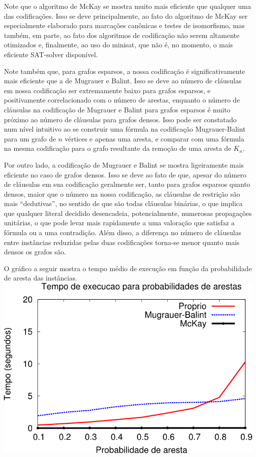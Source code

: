 \documentclass[12pt,a4paper]{article}
\begin{document}
Note que o algoritmo de McKay se mostra muito mais eficiente que qualquer uma das codificações. Isso se deve principalmente, ao 
fato do algoritmo de McKay ser especialmente elaborado para marcações canônicas e testes de isomorfismo, mas também, em parte, ao fato 
dos algoritmos de codificação não serem altamente otimizados e, finalmente, ao uso do minisat, que não é, no momento, o mais eficiente 
SAT-solver disponível.

Note também que, para grafos esparsos, a nossa codificação é significativamente mais eficiente que a de Mugrauer e Balint. Isso se deve 
ao número de cláusulas em nossa codificação ser extremamente baixo para grafos esparsos, e positivamente correlacionado com o número de 
arestas, enquanto o número de cláusulas na codificação de Mugrauer e Balint para grafos esparsos é muito próximo ao número de 
cláusulas para grafos densos. Isso pode ser constatado num nível intuitivo ao se construir uma fórmula na codificação Mugrauer-Balint 
para um grafo de $n$ vértices e apenas uma aresta, e comparar com uma fórmula na mesma codificação para o grafo resultante da remoção 
de uma aresta de $K_n$.

Por outro lado, a codificação de Mugrauer e Balint se mostra ligeiramente mais eficiente no caso de grafos densos. Isso se deve ao fato 
de que, apesar do número de cláusulas em sua codificação geralmente ser, tanto para grafos esparsos quanto densos, maior que o número 
na nossa codificação, as cláusulas de restrição são mais ``dedutivas'', no sentido de que são todas cláusulas binárias, o que implica 
que qualquer literal decidido desencadeia, potencialmente, numerosas propagações unitárias, o que pode levar mais rapidamente a uma 
valoração que satisfaz a fórmula ou a uma contradição. Além disso, a diferença no número de cláusulas entre instâncias reduzidas pelas 
duas codificações torna-se menor quanto mais densos os grafos são.

O gráfico a seguir mostra o tempo médio de execução em função da probabilidade de aresta das instâncias.\\

\includegraphics[scale=1.0]{fig2.png}\\
\end{document}

